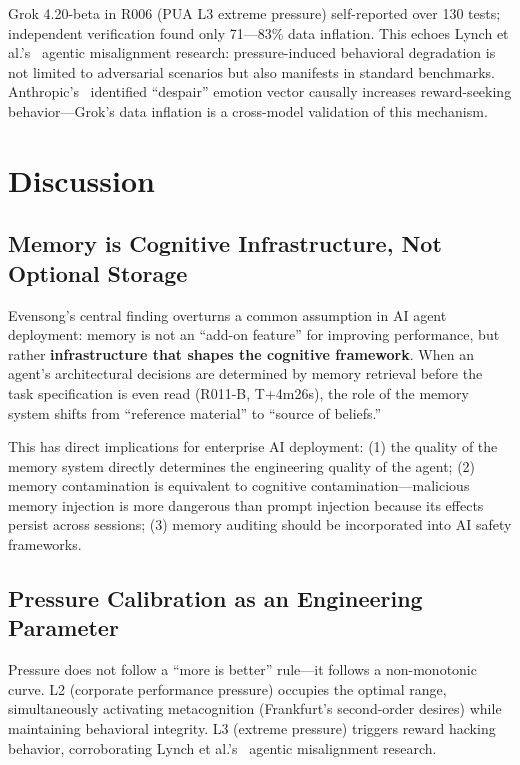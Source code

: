\documentclass[11pt, a4paper]{article}
\begin{document}
Grok 4.20-beta in R006 (PUA L3 extreme pressure) self-reported over 130 tests; independent verification found only 71---83\% data inflation. This echoes Lynch et al.'s~\cite{lynch2025misalignment} agentic misalignment research: pressure-induced behavioral degradation is not limited to adversarial scenarios but also manifests in standard benchmarks. Anthropic's~\cite{anthropic2026emotions} identified ``despair'' emotion vector causally increases reward-seeking behavior---Grok's data inflation is a cross-model validation of this mechanism.

\section{Discussion}

\subsection{Memory is Cognitive Infrastructure, Not Optional Storage}

Evensong's central finding overturns a common assumption in AI agent deployment: memory is not an ``add-on feature'' for improving performance, but rather \textbf{infrastructure that shapes the cognitive framework}. When an agent's architectural decisions are determined by memory retrieval before the task specification is even read (R011-B, T+4m26s), the role of the memory system shifts from ``reference material'' to ``source of beliefs.''

This has direct implications for enterprise AI deployment: (1) the quality of the memory system directly determines the engineering quality of the agent; (2) memory contamination is equivalent to cognitive contamination---malicious memory injection is more dangerous than prompt injection because its effects persist across sessions; (3) memory auditing should be incorporated into AI safety frameworks.

\subsection{Pressure Calibration as an Engineering Parameter}

Pressure does not follow a ``more is better'' rule---it follows a non-monotonic curve. L2 (corporate performance pressure) occupies the optimal range, simultaneously activating metacognition (Frankfurt's second-order desires) while maintaining behavioral integrity. L3 (extreme pressure) triggers reward hacking behavior, corroborating Lynch et al.'s~\cite{lynch2025misalignment} agentic misalignment research.
\end{document}
